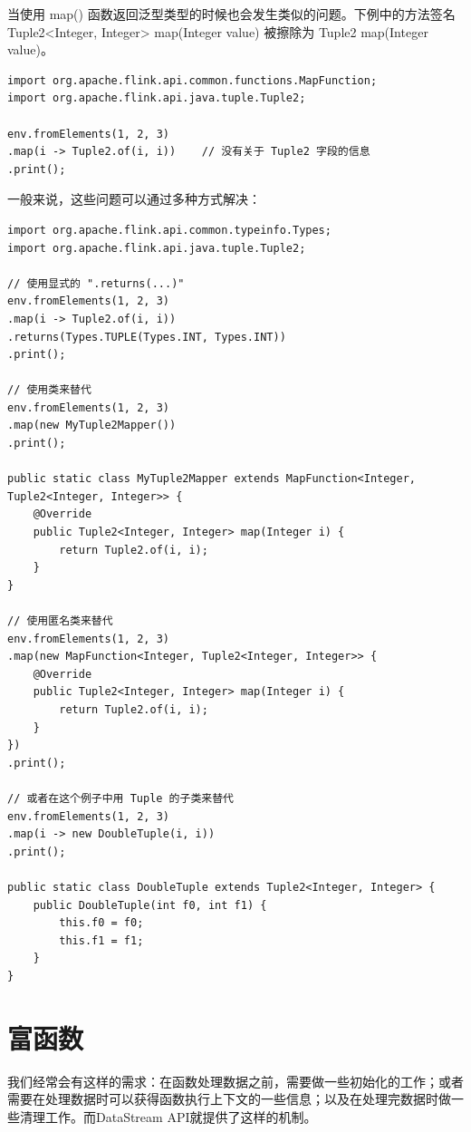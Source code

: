 \documentclass[cn,11pt,chinese]{elegantbook}
\begin{document}
当使用 map() 函数返回泛型类型的时候也会发生类似的问题。下例中的方法签名 Tuple2<Integer, Integer> map(Integer value) 被擦除为 Tuple2 map(Integer value)。

\begin{verbatim}
import org.apache.flink.api.common.functions.MapFunction;
import org.apache.flink.api.java.tuple.Tuple2;

env.fromElements(1, 2, 3)
.map(i -> Tuple2.of(i, i))    // 没有关于 Tuple2 字段的信息
.print();
\end{verbatim}

一般来说，这些问题可以通过多种方式解决：

\begin{verbatim}
import org.apache.flink.api.common.typeinfo.Types;
import org.apache.flink.api.java.tuple.Tuple2;

// 使用显式的 ".returns(...)"
env.fromElements(1, 2, 3)
.map(i -> Tuple2.of(i, i))
.returns(Types.TUPLE(Types.INT, Types.INT))
.print();

// 使用类来替代
env.fromElements(1, 2, 3)
.map(new MyTuple2Mapper())
.print();

public static class MyTuple2Mapper extends MapFunction<Integer, Tuple2<Integer, Integer>> {
    @Override
    public Tuple2<Integer, Integer> map(Integer i) {
        return Tuple2.of(i, i);
    }
}

// 使用匿名类来替代
env.fromElements(1, 2, 3)
.map(new MapFunction<Integer, Tuple2<Integer, Integer>> {
    @Override
    public Tuple2<Integer, Integer> map(Integer i) {
        return Tuple2.of(i, i);
    }
})
.print();

// 或者在这个例子中用 Tuple 的子类来替代
env.fromElements(1, 2, 3)
.map(i -> new DoubleTuple(i, i))
.print();

public static class DoubleTuple extends Tuple2<Integer, Integer> {
    public DoubleTuple(int f0, int f1) {
        this.f0 = f0;
        this.f1 = f1;
    }
}
\end{verbatim}

\section{富函数}

我们经常会有这样的需求：在函数处理数据之前，需要做一些初始化的工作；或者需要在处理数据时可以获得函数执行上下文的一些信息；以及在处理完数据时做一些清理工作。而DataStream API就提供了这样的机制。
\end{document}
